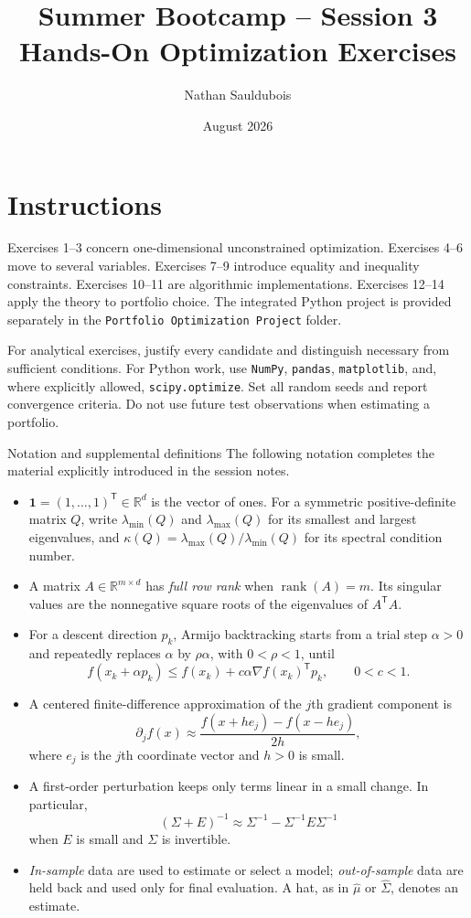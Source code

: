 \documentclass[10pt]{article}
\title{Summer Bootcamp -- Session 3\\Hands-On Optimization Exercises}
\author{Nathan Sauldubois}
\date{August 2026}
\newcommand{\R}{\mathbb{R}}
\newcommand{\trans}{^{\mathsf T}}
\begin{document}
\maketitle

\section*{Instructions}

Exercises 1--3 concern one-dimensional unconstrained optimization. Exercises
4--6 move to several variables. Exercises 7--9 introduce equality and
inequality constraints. Exercises 10--11 are algorithmic implementations.
Exercises 12--14 apply the theory to portfolio choice. The integrated Python
project is provided separately in the
\texttt{Portfolio Optimization Project} folder.

For analytical exercises, justify every candidate and distinguish necessary
from sufficient conditions. For Python work, use \texttt{NumPy},
\texttt{pandas}, \texttt{matplotlib}, and, where explicitly allowed,
\texttt{scipy.optimize}. Set all random seeds and report convergence criteria.
Do not use future test observations when estimating a portfolio.

\begin{conceptbox}{Notation and supplemental definitions}
The following notation completes the material explicitly introduced in the
session notes.
\begin{itemize}
  \item $\mathbf1=(1,\ldots,1)\trans\in\R^d$ is the vector of ones.
  For a symmetric positive-definite matrix $Q$, write
  $\lambda_{\min}(Q)$ and $\lambda_{\max}(Q)$ for its smallest and largest
  eigenvalues, and
  $\kappa(Q)=\lambda_{\max}(Q)/\lambda_{\min}(Q)$ for its spectral condition
  number.
  \item A matrix $A\in\R^{m\times d}$ has \emph{full row rank} when
  $\operatorname{rank}(A)=m$. Its singular values are the nonnegative square
  roots of the eigenvalues of $A\trans A$.
  \item For a descent direction $p_k$, Armijo backtracking starts from a trial
  step $\alpha>0$ and repeatedly replaces $\alpha$ by $\rho\alpha$, with
  $0<\rho<1$, until
  \[
    f(x_k+\alpha p_k)
    \leq f(x_k)+c\alpha\nabla f(x_k)\trans p_k,
    \qquad 0<c<1.
  \]
  \item A centered finite-difference approximation of the $j$th gradient
  component is
  \[
    \partial_j f(x)\approx
    \frac{f(x+he_j)-f(x-he_j)}{2h},
  \]
  where $e_j$ is the $j$th coordinate vector and $h>0$ is small.
  \item A first-order perturbation keeps only terms linear in a small change.
  In particular,
  \[
    (\Sigma+E)^{-1}
    \approx\Sigma^{-1}-\Sigma^{-1}E\Sigma^{-1}
  \]
  when $E$ is small and $\Sigma$ is invertible.
  \item \emph{In-sample} data are used to estimate or select a model;
  \emph{out-of-sample} data are held back and used only for final evaluation.
  A hat, as in $\widehat\mu$ or $\widehat\Sigma$, denotes an estimate.
\end{itemize}
\end{conceptbox}
\end{document}
